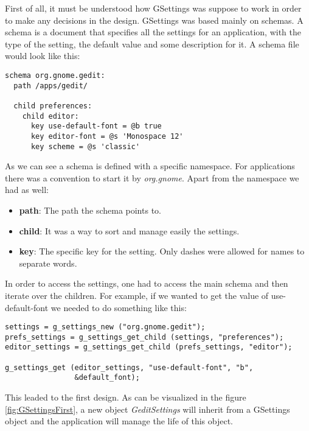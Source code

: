 First of all,  it must be understood how GSettings was suppose to work in order to make any decisions in the design. GSettings was based mainly on schemas. A schema is a document that specifies all the settings for an application, with the type of the setting, the default value and some description for it. A schema file would look like this:

\begin{lstlisting}[style=GObject]
schema org.gnome.gedit:
  path /apps/gedit/

  child preferences:
    child editor:
      key use-default-font = @b true
      key editor-font = @s 'Monospace 12'
      key scheme = @s 'classic'

\end{lstlisting}

As we can see a schema is defined with a specific namespace. For \GNOME applications there was a convention to start it by \emph{org.gnome}. Apart from the namespace we had as well:
\begin{itemize}
  \item \textbf{path}: The path the schema points to.
  \item \textbf{child}: It was a way to sort and manage easily the settings.
  \item \textbf{key}: The specific key for the setting. Only dashes were allowed for names to separate words.
\end{itemize}

In order to access the settings,  one had to access the main schema and then iterate over the children. For example, if we wanted to get the value of use-default-font we needed to do something like this:

\begin{lstlisting}[style=GObject]
settings = g_settings_new ("org.gnome.gedit");
prefs_settings = g_settings_get_child (settings, "preferences");
editor_settings = g_settings_get_child (prefs_settings, "editor");

g_settings_get (editor_settings, "use-default-font", "b",
                &default_font);
\end{lstlisting}

This leaded to the first design. As can be visualized in the figure \ref{fig:GSettingsFirst}, a new object \emph{GeditSettings} will inherit from a GSettings object and the application will manage the life of this object.


